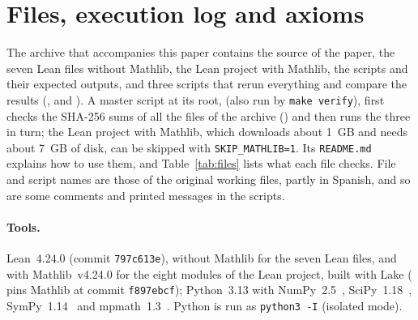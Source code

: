 \section{Files, execution log and axioms}\label{sec:archivos}
The archive that accompanies this paper contains the source of the paper, the seven Lean files without Mathlib, the Lean project with Mathlib, the scripts and their expected outputs, and three scripts that rerun everything and compare the results (,  and ). A master script at its root,  (also run by \texttt{make verify}), first checks the SHA-256 sums of all the files of the archive () and then runs the three in turn; the Lean project with Mathlib, which downloads about 1~GB and needs about 7~GB of disk, can be skipped with \texttt{SKIP\_MATHLIB=1}. Its \texttt{README.md} explains how to use them, and Table~\ref{tab:files} lists what each file checks. File and script names are those of the original working files, partly in Spanish, and so are some comments and printed messages in the scripts.

\paragraph{Tools.} Lean~4.24.0 (commit \texttt{797c613e}), without Mathlib for the seven Lean files, and with Mathlib~v4.24.0 for the eight modules of the Lean project, built with Lake ( pins Mathlib at commit \texttt{f897ebcf}); Python~3.13 with NumPy~2.5~\cite{NumPy2020}, SciPy~1.18~\cite{SciPy2020}, SymPy~1.14~\cite{SymPy2017} and mpmath~1.3~\cite{mpmath}. Python is run as \texttt{python3 -I} (isolated mode).

